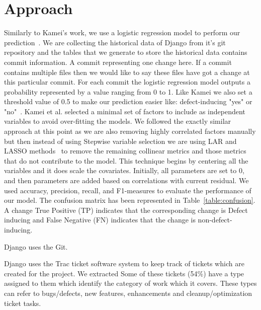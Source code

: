 \documentclass[10pt, conference]{IEEEtran}
\begin{document}
\section{Approach}
\label{sec:approach}
Similarly to Kamei's work, we use a logistic regression model to perform our prediction~\cite{Kamei2013TSE}. We are collecting the historical data of Django from it's git repository and the tables that we generate to store the historical data contains commit information. A commit representing one change here. If a commit contains multiple files then we would like to say these files have got a change at this particular commit. For each commit the logistic regression model outputs a probability represented by a value ranging from 0 to 1. Like Kamei we also set a threshold value of 0.5 to make our prediction easier like: defect-inducing "yes" or "no"~\cite{Gyimothy2005TSE,Guo2010ICSE}.
Kamei et al. selected a minimal set of factors to include as independent variables to avoid over-fitting the models. We followed the exactly similar approach at this point as we are also removing highly correlated factors manually but then instead of using Stepwise variable selection we are using LAR and LASSO methods~\cite{Flom2007NESUG} to remove the remaining collinear metrics and those metrics that do not contribute to the model. This technique begins by centering all the variables and it does scale the covariates. Initially, all parameters are set to 0, and then parameters are added based on correlations with current residual. 
We used accuracy, precision, recall, and F1-measures to evaluate the performance of our model. The confusion matrix has been represented in Table~\ref{table:confusion}. A change True Positive (TP) indicates that the corresponding change is Defect inducing and False Negative (FN) indicates that the change is non-defect-inducing.

Django uses the Git.   

Django uses the Trac ticket software system to keep track of tickets which are created for the project. We extracted Some of these tickets (54\%) have a type assigned to them which identify the category of work which it covers. These types can refer to bugs/defects, new features, enhancements and cleanup/optimization ticket tasks. 
\end{document}
